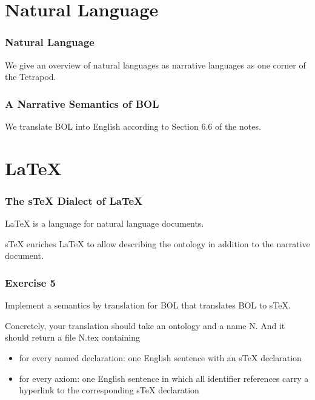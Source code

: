 \section{Natural Language}

\begin{frame}\frametitle{Natural Language}
We give an overview of natural languages as narrative languages as one corner of the Tetrapod.
\end{frame}

\begin{frame}\frametitle{A Narrative Semantics of BOL}
We translate BOL into English according to Section 6.6 of the notes.
\end{frame}

\section{LaTeX}

\begin{frame}\frametitle{The sTeX Dialect of LaTeX}
LaTeX is a language for natural language documents.

sTeX enriches LaTeX to allow describing the ontology in addition to the narrative document.
\end{frame}

\begin{frame}\frametitle{Exercise 5}
Implement a semantics by translation for BOL that translates BOL to sTeX.

Concretely, your translation should take an ontology and a name N.
And it should return a file N.tex containing
\begin{itemize}
 \item for every named declaration: one English sentence with an sTeX declaration
 \item for every axiom: one English sentence in which all identifier references carry a hyperlink to the corresponding sTeX declaration
\end{itemize}
\end{frame}
